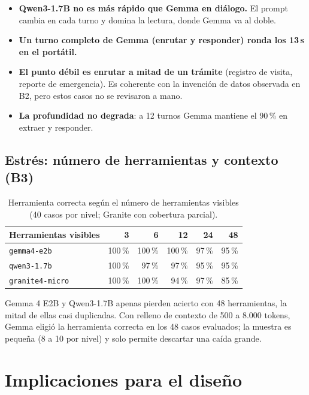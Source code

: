 \documentclass[11pt,a4paper]{article}
\newcommand{\m}[1]{\texttt{#1}}
\begin{document}
\begin{itemize}
\item \textbf{Qwen3-1.7B no es más rápido que Gemma en diálogo.} El prompt cambia en cada turno y domina la lectura, donde Gemma va al doble.
\item \textbf{Un turno completo de Gemma (enrutar y responder) ronda los 13\,s en el portátil.}
\item \textbf{El punto débil es enrutar a mitad de un trámite} (registro de visita, reporte de emergencia). Es coherente con la invención de datos observada en B2, pero estos casos no se revisaron a mano.
\item \textbf{La profundidad no degrada}: a 12 turnos Gemma mantiene el 90\,\% en extraer y responder.
\end{itemize}

\subsection{Estrés: número de herramientas y contexto (B3)}

\begin{table}[H]
\centering\small
\caption{Herramienta correcta según el número de herramientas visibles (40 casos por nivel; Granite con cobertura parcial).}\label{tab:tools}
\begin{tabularx}{\textwidth}{@{}p{}RRRRR@{}}
\toprule
Herramientas visibles & 3 & 6 & 12 & 24 & 48\\
\midrule
\m{gemma4-e2b} & 100\,\% & 100\,\% & 100\,\% & 97\,\% & 95\,\%\\
\m{qwen3-1.7b} & 100\,\% & 97\,\% & 97\,\% & 95\,\% & 95\,\%\\
\m{granite4-micro} & 100\,\% & 100\,\% & 94\,\% & 97\,\% & 85\,\%\\
\bottomrule
\end{tabularx}
\end{table}

Gemma 4 E2B y Qwen3-1.7B apenas pierden acierto con 48 herramientas, la mitad de ellas casi duplicadas. Con relleno de contexto de 500 a 8.000 tokens, Gemma eligió la herramienta correcta en los 48 casos evaluados; la muestra es pequeña (8 a 10 por nivel) y solo permite descartar una caída grande.

\section{Implicaciones para el diseño}
\end{document}
